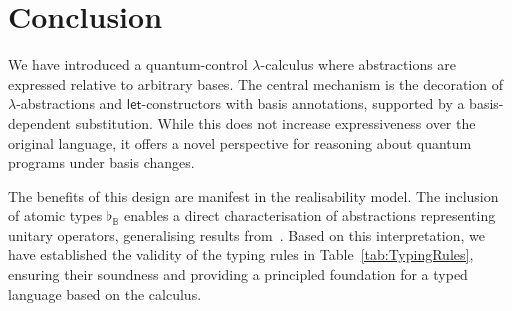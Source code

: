 \documentclass[a4paper,UKenglish,numberwithinsect,pdfa,anonymous]{lipics-v2021}
\theoremstyle{restatestyle}
\newcommand\ket[1]{\ensuremath{|#1\rangle}}
\def\Pair#1#2{(#1,#2)} %
\def\Lam#1#2#3{\lambda#1^{#2}{.}#3} %
\def\letkeyword{\mathsf{let}}
\def\inkeyword{\mathsf{in}}
\def\LetP#1#2#3#4#5#6{\letkeyword\,\Pair{#1^{#2}}{#3^{#4}}=#5~\inkeyword~#6}
\def\BB{\mathbb{B}}
\def\Arr{\Rightarrow}
\newcommand\B{\mathbb Z}
\newcommand{\Bell}{\mathsf{Bell}}
\newcommand{\lambdaB}{\lambda_B}
\newcommand\basis[1]{\ensuremath{\flat_{#1}}}
\begin{document}
%
%

\section{Conclusion}\label{sec:conclusion}
We have introduced a quantum-control $\lambda$-calculus where abstractions are expressed relative to arbitrary bases. The central mechanism is the decoration of $\lambda$-abstractions and $\mathsf{let}$-constructors with basis annotations, supported by a basis-dependent substitution. While this does not increase expressiveness over the original language, it offers a novel perspective for reasoning about quantum programs under basis changes. 

The benefits of this design are manifest in the realisability model. The inclusion of atomic types $\basis{\BB}$ enables a direct characterisation of abstractions representing unitary operators, generalising results from~\cite{DiazcaroGuillermoMiquelValironLICS19}. Based on this interpretation, we have established the validity of the typing rules in Table~\ref{tab:TypingRules}, ensuring their soundness and providing a principled foundation for a typed language based on the calculus.
\end{document}
